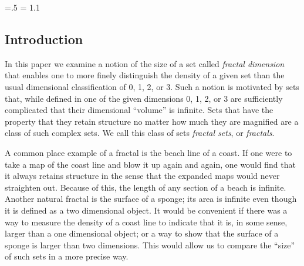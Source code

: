 


\def\dup{%
\setbox0=\hbox{\copy0 \kern\wd0 \copy0}}

\newcount \fcount
\newcount \fcountsponge


\def\fracaux{
\ifnum\fcount>0
\advance\fcount by-1
\dup
\fracaux \else \fi
}

\def\cantor#1#2{%
\setbox0=\hbox{\vrule height1pt width #2pt}
\offinterlineskip
\fcount=#1
\fracaux
\vbox{\copy0}}


\def\tri{%
\setbox0=\vbox{\hbox{\kern.5\wd0\copy0}\hbox{\copy0\copy0}}
}

\newcount \fcount

\def\fracrepstep{
\ifnum\fcountsponge>0
\advance\fcountsponge by-1
\tri
\fracrepstep
\else
\fi
}

\def\fsponge#1{%
\setbox0=\hbox{\vrule height1pt width1pt \kern1pt}
\offinterlineskip
\fcountsponge=#1
\fracrepstep
\vbox{\copy0}}




\parindent=0pt
\parskip=.5\baselineskip
\baselineskip = 1.1\baselineskip

\subsection{Introduction}
In this paper we examine a notion of the size of a set called 
{\it fractal dimension} that enables one to more
finely distinguish the density of a given set than the usual
dimensional classification of 0, 1, 2, or 
{\parindent=0pt
3}. Such a notion is 
motivated by sets that, while defined in one of the given
dimensions 0, 1, 2, or 3 are sufficiently
complicated that their dimensional ``volume'' is infinite. 
Sets that have
the property that they retain structure no matter how much they are
magnified are a class of such complex sets. We call this class of sets
{\it fractal sets}, or
{\it fractals}. 

A common place example of a fractal is the beach line of
a coast. If one were to take a map of the coast line and blow it up
again and again, one would find that it always retains structure in the
sense that the expanded maps would never straighten out.
Because of this, the length of any section of a beach is
infinite. Another natural fractal is the surface of a sponge; its area is
infinite even though it is defined as a two dimensional object. 
It would be convenient if there was a way to
measure the density of a coast line to
indicate that it is, in some sense, larger than a one dimensional
object; or a way to show that the surface of a sponge is larger than
two dimensions. This would allow us to compare the ``size'' of such sets
in a more precise way.

